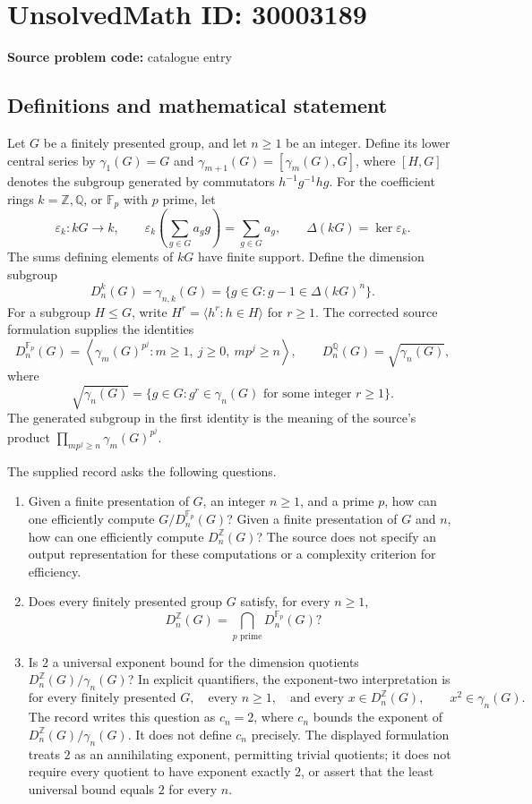 \documentclass[11pt]{article}
\newcommand{\Z}{\mathbb{Z}}
\newcommand{\Q}{\mathbb{Q}}
\newcommand{\F}{\mathbb{F}}
\begin{document}
\section*{UnsolvedMath ID: 30003189}
\textbf{Source problem code:} catalogue entry
\subsection{Definitions and mathematical statement}
Let \(G\) be a finitely presented group, and let \(n\geq 1\) be an integer. Define its lower central series by \(\gamma_1(G)=G\) and \(\gamma_{m+1}(G)=[\gamma_m(G),G]\), where \([H,G]\) denotes the subgroup generated by commutators \(h^{-1}g^{-1}hg\). For the coefficient rings \(k=\Z,\Q\), or \(\F_p\) with \(p\) prime, let
\[
\varepsilon_k:kG\longrightarrow k,\qquad
\varepsilon_k\!\left(\sum_{g\in G}a_g g\right)=\sum_{g\in G}a_g,
\qquad \Delta(kG)=\ker\varepsilon_k.
\]
The sums defining elements of \(kG\) have finite support. Define the dimension subgroup
\[
D_n^k(G)=\gamma_{n,k}(G)=\{g\in G:g-1\in\Delta(kG)^n\}.
\]
For a subgroup \(H\leq G\), write \(H^r=\langle h^r:h\in H\rangle\) for \(r\geq1\). The corrected source formulation supplies the identities
\[
D_n^{\F_p}(G)
=\left\langle\gamma_m(G)^{p^j}:m\geq1,\ j\geq0,\ mp^j\geq n\right\rangle,
\qquad
D_n^{\Q}(G)=\sqrt{\gamma_n(G)},
\]
where
\[
\sqrt{\gamma_n(G)}=\{g\in G:g^r\in\gamma_n(G)\text{ for some integer }r\geq1\}.
\]
The generated subgroup in the first identity is the meaning of the source's product \(\prod_{mp^j\geq n}\gamma_m(G)^{p^j}\).

The supplied record asks the following questions.
\begin{enumerate}
\item Given a finite presentation of \(G\), an integer \(n\geq1\), and a prime \(p\), how can one efficiently compute \(G/D_n^{\F_p}(G)\)? Given a finite presentation of \(G\) and \(n\), how can one efficiently compute \(D_n^{\Z}(G)\)? The source does not specify an output representation for these computations or a complexity criterion for efficiency.
\item Does every finitely presented group \(G\) satisfy, for every \(n\geq1\),
\[
D_n^{\Z}(G)=\bigcap_{p\text{ prime}}D_n^{\F_p}(G)?
\]
\item Is \(2\) a universal exponent bound for the dimension quotients \(D_n^{\Z}(G)/\gamma_n(G)\)? In explicit quantifiers, the exponent-two interpretation is
\[
\text{for every finitely presented }G,\quad
\text{every }n\geq1,\quad
\text{and every }x\in D_n^{\Z}(G),\qquad x^2\in\gamma_n(G).
\]
The record writes this question as \(c_n=2\), where \(c_n\) bounds the exponent of \(D_n^{\Z}(G)/\gamma_n(G)\). It does not define \(c_n\) precisely. The displayed formulation treats \(2\) as an annihilating exponent, permitting trivial quotients; it does not require every quotient to have exponent exactly \(2\), or assert that the least universal bound equals \(2\) for every \(n\).
\end{enumerate}
\end{document}
